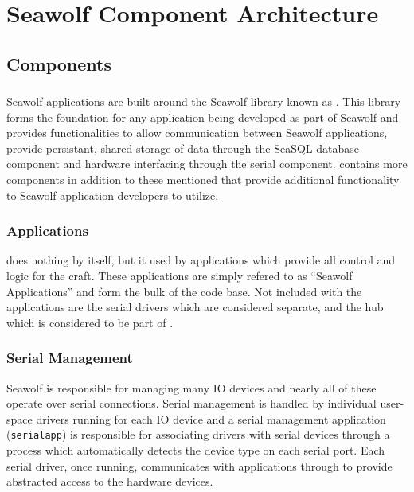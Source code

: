 
\newpage
\section{Seawolf Component Architecture} \label{architecture}
\subsection{Components} \label{archcomp}
\subsubsection{\libseawolf{}} \label{libarch}
Seawolf applications are built around the Seawolf library known as
\libseawolf{}. This library forms the foundation for any application being
developed as part of Seawolf and provides functionalities to allow communication
between Seawolf applications, provide persistant, shared storage of data through
the SeaSQL database component and hardware interfacing through the serial
component. \libseawolf{} contains more components in addition to these mentioned
that provide additional functionality to Seawolf application developers to
utilize.

\subsubsection{Applications} \label{apparch}
\libseawolf{} does nothing by itself, but it used by 
applications which provide all control and logic for the craft. These
applications are simply refered to as ``Seawolf Applications'' and form the bulk
of the code base. Not included with the applications are the serial drivers
which are considered separate, and the hub which is considered to be part
of \libseawolf{}.

\subsubsection{Serial Management} \label{serialarch}
Seawolf is responsible for managing many IO devices and nearly all of these
operate over serial connections. Serial management is handled by individual
user-space drivers running for each IO device and a serial management
application (\texttt{serialapp}) is responsible for associating drivers with
serial devices through a process which automatically detects the device type on
each serial port. Each serial driver, once running, communicates with
applications through \libseawolf{} to provide abstracted access to the hardware
devices.

